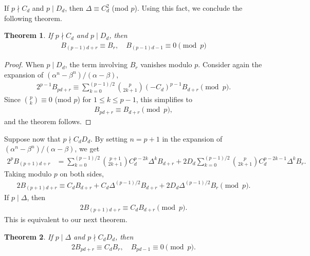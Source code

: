 \documentclass[12pt]{article}
\theoremstyle{plain}
\newtheorem{theorem}{Theorem}
\theoremstyle{definition}
\theoremstyle{remark}
\begin{document}
If $ p \nmid C_d $ and $ p \mid D_d $, then $ \Delta \equiv C_d^2 $ (mod $ p $). Using this fact, we conclude the following theorem.
\begin{theorem} If $ p \nmid C_d $ and $ p \mid D_d $, then
\begin{align*}
	B_{(p - 1)d + r} \equiv B_r, \quad B_{(p - 1)d - 1} \equiv 0 \pmod{p}
\end{align*}
\end{theorem}

\begin{proof} When $ p \mid D_d $, the term involving $ B_r $ vanishes modulo $ p $. Consider again the expansion of $ (\alpha^n - \beta^n)/(\alpha - \beta) $, 
\begin{align*}
	2^{p - 1} B_{pd + r} \equiv \sum_{k = 0}^{(p - 1)/2} \binom{p}{2k + 1} (-C_d)^{p - 1} B_{d + r} \pmod{p}.
\end{align*}
Since $ \binom{p}{k} \equiv 0 $ (mod $ p $) for $ 1 \leq k \leq p - 1 $, this simplifies to 
\begin{align*}
	B_{pd + r} \equiv B_{d + r} \pmod{p},
\end{align*}
and the theorem follows.
\end{proof}

Suppose now that $ p \nmid C_d D_d $. By setting $ n = p + 1 $ in the expansion of $ (\alpha^n - \beta^n)/(\alpha - \beta) $, we get
\begin{align*}
	2^p B_{(p + 1)d + r} &= \sum_{k = 0}^{(p - 1)/2} \binom{p + 1}{2k + 1} C_d^{p - 2k} \Delta^k B_{d + r} + 2D_d \sum_{k = 0}^{(p - 1)/2} \binom{p}{2k + 1} C_d^{p - 2k - 1} \Delta^k B_r.
\end{align*}
Taking modulo $ p $ on both sides,
\begin{align*}
	2B_{(p + 1)d + r} \equiv C_d B_{d + r} + C_d \Delta^{(p - 1)/2} B_{d + r} + 2D_d \Delta^{(p - 1)/2} B_r \pmod{p}.
\end{align*}
If $ p \mid \Delta $, then
\begin{align*}
	2B_{(p + 1)d + r} \equiv C_d B_{d + r} \pmod{p}.
\end{align*}
This is equivalent to our next theorem.
\begin{theorem} \label{Th:Divisibility_Complete} If $ p \mid \Delta $ and $ p \nmid C_d D_d $, then
\begin{align*}
	2B_{pd + r} \equiv C_d B_r, \quad B_{pd - 1} \equiv 0\pmod{p}.
\end{align*}
\end{theorem}
\end{document}
